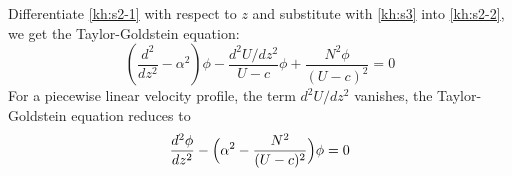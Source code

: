 Differentiate \eqref{kh:s2-1} with respect to $z$ and substitute
with \eqref{kh:s3} into \eqref{kh:s2-2}, we get the Taylor-Goldstein
equation:
\begin{equation}\label{tay:eq}
    \boxed{(\frac{d^2}{dz^2}-\alpha^2)\phi-\frac{d^2U/dz^2}{U-c}\phi+\frac{N^2\phi}{(U-c)^2}=0}
\end{equation}
\newslide
For a piecewise linear velocity profile, the term $d^2U/dz^2$
vanishes, the Taylor-Goldstein equation reduces to
\begin{equation}\label{tay:eq2}
    \frac{d^2\phi}{dz^2}-\Bigl(\alpha^2-\frac{N^2}{(U-c)^2}\Bigr)\phi=0
\end{equation}
